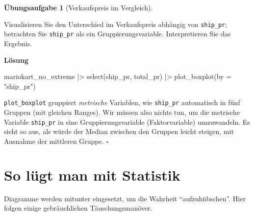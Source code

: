 \documentclass[
  letterpaper,
  oneside,
  open=any]{scrbook}
\newenvironment{Shaded}{\begin{snugshade}}{\end{snugshade}}
\newcommand{\AttributeTok}[1]{\textcolor[rgb]{0.40,0.45,0.13}{#1}}
\newcommand{\FunctionTok}[1]{\textcolor[rgb]{0.28,0.35,0.67}{#1}}
\newcommand{\NormalTok}[1]{\textcolor[rgb]{0.00,0.23,0.31}{#1}}
\newcommand{\SpecialCharTok}[1]{\textcolor[rgb]{0.37,0.37,0.37}{#1}}
\newcommand{\StringTok}[1]{\textcolor[rgb]{0.13,0.47,0.30}{#1}}
\theoremstyle{definition}
\newtheorem{exercise}{Übungsaufgabe}[chapter]
\theoremstyle{definition}
\theoremstyle{definition}
\theoremstyle{remark}
\begin{document}
\begin{exercise}[Verkaufspreis im
Vergleich]\protect\hypertarget{exr-diff-plot}{}\label{exr-diff-plot}

Visualisieren Sie den Unterschied im Verkaufspreis abhängig von
\texttt{ship\_pr}; betrachten Sie \texttt{ship\_pr} als ein
Gruppierungsvariable. Interpretieren Sie das Ergebnis.

\textbf{Lösung}

\begin{Shaded}
\begin{Highlighting}[]
\NormalTok{mariokart\_no\_extreme }\SpecialCharTok{|\textgreater{}} 
  \FunctionTok{select}\NormalTok{(ship\_pr, total\_pr) }\SpecialCharTok{|\textgreater{}} 
  \FunctionTok{plot\_boxplot}\NormalTok{(}\AttributeTok{by =} \StringTok{"ship\_pr"}\NormalTok{)}
\end{Highlighting}
\end{Shaded}

\texttt{plot\_boxplot} gruppiert \emph{metrische} Variablen, wie
\texttt{ship\_pr} automatisch in fünf Gruppen (mit gleichen Ranges). Wir
müssen also nichts tun, um die metrische Variable \texttt{ship\_pr} in
eine Gruppierungsvariable (Faktorvariable) umzuwandeln. Es sieht so aus,
als würde der Median zwischen den Gruppen leicht steigen, mit Ausnahme
der mittleren Gruppe. \(\square\)

\end{exercise}

\section{So lügt man mit Statistik}\label{so-luxfcgt-man-mit-statistik}

Diagramme werden mitunter eingesetzt, um die Wahrheit
\enquote{aufzuhübschen}. Hier folgen einige gebräuchlichen
Täuschungsmanöver.
\end{document}
